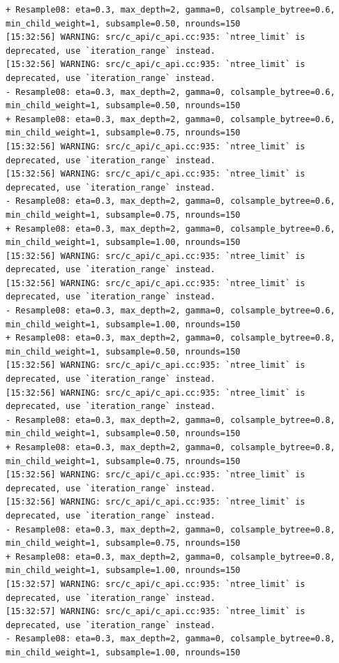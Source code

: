 \documentclass[
  letterpaper,
  DIV=11,
  numbers=noendperiod]{scrartcl}
\begin{document}
\begin{verbatim}
+ Resample08: eta=0.3, max_depth=2, gamma=0, colsample_bytree=0.6, min_child_weight=1, subsample=0.50, nrounds=150 
[15:32:56] WARNING: src/c_api/c_api.cc:935: `ntree_limit` is deprecated, use `iteration_range` instead.
[15:32:56] WARNING: src/c_api/c_api.cc:935: `ntree_limit` is deprecated, use `iteration_range` instead.
- Resample08: eta=0.3, max_depth=2, gamma=0, colsample_bytree=0.6, min_child_weight=1, subsample=0.50, nrounds=150 
+ Resample08: eta=0.3, max_depth=2, gamma=0, colsample_bytree=0.6, min_child_weight=1, subsample=0.75, nrounds=150 
[15:32:56] WARNING: src/c_api/c_api.cc:935: `ntree_limit` is deprecated, use `iteration_range` instead.
[15:32:56] WARNING: src/c_api/c_api.cc:935: `ntree_limit` is deprecated, use `iteration_range` instead.
- Resample08: eta=0.3, max_depth=2, gamma=0, colsample_bytree=0.6, min_child_weight=1, subsample=0.75, nrounds=150 
+ Resample08: eta=0.3, max_depth=2, gamma=0, colsample_bytree=0.6, min_child_weight=1, subsample=1.00, nrounds=150 
[15:32:56] WARNING: src/c_api/c_api.cc:935: `ntree_limit` is deprecated, use `iteration_range` instead.
[15:32:56] WARNING: src/c_api/c_api.cc:935: `ntree_limit` is deprecated, use `iteration_range` instead.
- Resample08: eta=0.3, max_depth=2, gamma=0, colsample_bytree=0.6, min_child_weight=1, subsample=1.00, nrounds=150 
+ Resample08: eta=0.3, max_depth=2, gamma=0, colsample_bytree=0.8, min_child_weight=1, subsample=0.50, nrounds=150 
[15:32:56] WARNING: src/c_api/c_api.cc:935: `ntree_limit` is deprecated, use `iteration_range` instead.
[15:32:56] WARNING: src/c_api/c_api.cc:935: `ntree_limit` is deprecated, use `iteration_range` instead.
- Resample08: eta=0.3, max_depth=2, gamma=0, colsample_bytree=0.8, min_child_weight=1, subsample=0.50, nrounds=150 
+ Resample08: eta=0.3, max_depth=2, gamma=0, colsample_bytree=0.8, min_child_weight=1, subsample=0.75, nrounds=150 
[15:32:56] WARNING: src/c_api/c_api.cc:935: `ntree_limit` is deprecated, use `iteration_range` instead.
[15:32:56] WARNING: src/c_api/c_api.cc:935: `ntree_limit` is deprecated, use `iteration_range` instead.
- Resample08: eta=0.3, max_depth=2, gamma=0, colsample_bytree=0.8, min_child_weight=1, subsample=0.75, nrounds=150 
+ Resample08: eta=0.3, max_depth=2, gamma=0, colsample_bytree=0.8, min_child_weight=1, subsample=1.00, nrounds=150 
[15:32:57] WARNING: src/c_api/c_api.cc:935: `ntree_limit` is deprecated, use `iteration_range` instead.
[15:32:57] WARNING: src/c_api/c_api.cc:935: `ntree_limit` is deprecated, use `iteration_range` instead.
- Resample08: eta=0.3, max_depth=2, gamma=0, colsample_bytree=0.8, min_child_weight=1, subsample=1.00, nrounds=150 

\end{verbatim}
\end{document}
